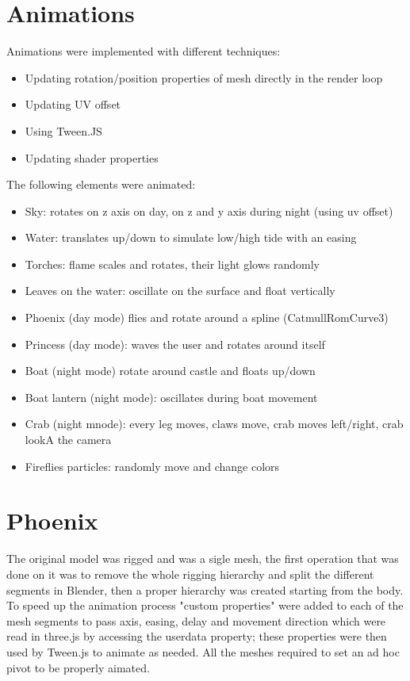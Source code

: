 \documentclass[10pt,a4paper]{article}
\begin{document}
\section{Animations}

Animations were implemented with different techniques:

\begin{itemize}
 \item Updating rotation/position properties of mesh directly in the render loop
 \item Updating UV offset
 \item Using Tween.JS
 \item Updating shader properties
\end{itemize}

\bigbreak
\bigskip

The following elements were animated:
\begin{itemize}
 \item Sky: rotates on z axis on day, on z and y axis during night (using uv offset)
 \item Water: translates up/down to simulate low/high tide with an easing
 \item Torches: flame scales and rotates, their light glows randomly
 \item Leaves on the water: oscillate on the surface and float vertically
 \item Phoenix (day mode) flies and rotate around a spline (CatmullRomCurve3)
 \item Princess (day mode): waves the user and rotates around itself
 \item Boat (night mode) rotate around castle and floats up/down
 \item Boat lantern (night mode): oscillates during boat movement
 \item Crab (night mnode): every leg moves, claws move, crab moves left/right, crab lookA the camera
 \item Fireflies particles: randomly move and change colors
 \end{itemize}

\section{Phoenix}

The original model was rigged and was a sigle mesh, the first operation that was done on it was to remove the whole rigging hierarchy and split the different segments in Blender, then a proper hierarchy was created starting  from the body. To speed up the animation process "custom properties" were  added to each of the mesh segments to pass axis, easing, delay and movement direction which were read in three.js by accessing the userdata property; these properties were then used by Tween.js to animate as needed. All the meshes required to set an ad hoc pivot to be properly aimated.
\end{document}

